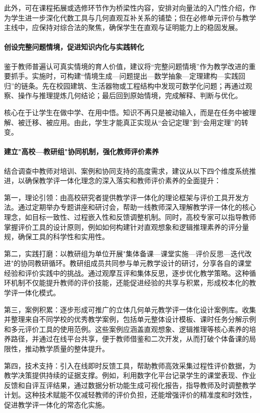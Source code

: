 \documentclass[UTF8,a4paper,12pt,twoside]{ctexart}
\begin{document}
此外，可在课程拓展或选修环节作为桥梁性内容，安排对向量法的入门性介绍，作为学生进一步深化代数工具与几何直观互补关系的铺垫；但在必修单元评价与教学主线中，应保持对综合法的聚焦，确保学生在直观与证明能力上的稳固发展。

\paragraph{创设完整问题情境，促进知识内化与实践转化}

鉴于教师普遍认可真实情境的育人价值，建议将“完整问题情境”作为教学改进的重要抓手。实施时，可构建“情境生成—问题提出—数学抽象—定理建构—实践回归”的链条。先在校园建筑、生活器物或工程结构中发现可数学化问题；再通过观察、操作与推理提炼几何结论；最后回到原始情境，完成解释、判断与优化。

核心在于让学生在做中学、在用中悟。知识不再只是被动输入，而是在任务中被理解、被迁移、被应用。由此，学生才能真正实现从“会记定理”到“会用定理”的转变。

\paragraph{建立"高校—教研组"协同机制，强化教师评价素养}

结合调查中教师对培训、案例和协同支持的高度需求，建议从以下四个维度系统推进，以确保教学评一体化理念的深入落实和教师评价素养的全面提升：

第一，理论引领：由高校研究者提供教学评一体化的理论框架与评价工具开发方法。通过定期举办专题讲座和研讨会，帮助一线教师深入理解教学评一体化的核心理念，如目标一致性、过程嵌入性和反馈调整机制。同时，高校专家可以指导教师掌握评价工具的设计原则，例如如何构建针对直观想象和逻辑推理素养的评分量规，确保工具的科学性和实用性。

第二，实践打磨：以教研组为单位开展"集体备课—课堂实施—评价反思—迭代改进"的协同教研循环。教研组成员共同参与单元教学设计的研讨，分享各自的课堂经验和评价实践中的挑战。通过观摩互评和集体反思，逐步优化教学策略。这种循环机制不仅能提升教师的评价技能，还能促进经验的共享与积累，形成校本化的教学评一体化模式。

第三，案例积累：逐步形成可推广的立体几何单元教学评一体化设计案例库。收集并整理来自不同学校的优秀教学案例，包括单元整体设计模板、课时任务分解示例和多元评价工具的使用范例。这些案例应涵盖直观想象、逻辑推理等核心素养的培养路径，并通过在线平台共享，便于教师借鉴和二次开发，从而打破个体备课的局限性，推动教学质量的整体提升。

第四，技术支持：引入在线即时反馈工具，帮助教师高效采集过程性评价数据，为教学决策提供持续的证据支撑。例如，利用数字化平台记录学生的课堂表现、作业反馈和自评互评结果，通过数据分析功能生成可视化报告，指导教师及时调整教学计划。这种技术赋能不仅减轻教师的评价负担，还能增强评价的精准度和时效性，促进教学评一体化的常态化实施。
\end{document}
